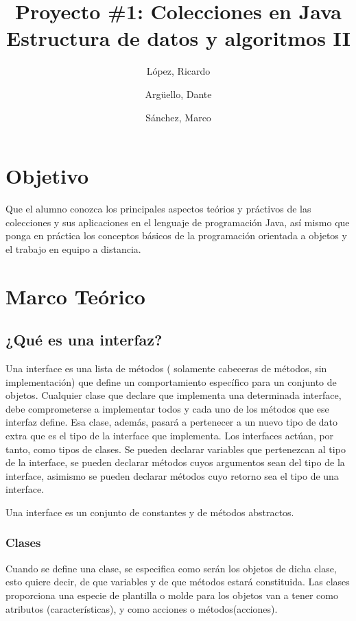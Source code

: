 \documentclass[11pt]{article}
\title{Proyecto \#1: Colecciones en Java\\
Estructura de datos y algoritmos II}
\author{López, Ricardo
\and Argüello, Dante
\and Sánchez, Marco}
\begin{document}
\maketitle{}

\section{Objetivo}
\par

Que el alumno conozca los principales aspectos teórios y práctivos de
las colecciones y sus aplicaciones en el lenguaje de programación Java,
así mismo que ponga en práctica los conceptos básicos de la programación
orientada a objetos y el trabajo en equipo a distancia.

\section{Marco Teórico}
\subsection{¿Qué es una interfaz?}

\par
Una interface es una lista de métodos ( solamente cabeceras de 
métodos, sin implementación) que define un comportamiento específico 
para un conjunto de objetos. Cualquier clase que declare que 
implementa una determinada interface, debe comprometerse a 
implementar todos y cada uno de los métodos que ese interfaz define. 
Esa clase, además, pasará a pertenecer a un nuevo tipo de dato extra 
que es el tipo de la interface que implementa. Los interfaces actúan, 
por tanto, como tipos de clases. Se pueden declarar variables que 
pertenezcan al tipo de la interface, se pueden declarar métodos cuyos 
argumentos sean del tipo de la interface, asimismo se pueden declarar 
métodos cuyo retorno sea el tipo de una interface.

\par
Una interface es un conjunto de constantes y de métodos abstractos.

\subsubsection{Clases}

\par
Cuando se define una clase, se especifica como serán los objetos de 
dicha clase, esto quiere decir, de que variables y de que métodos 
estará constituida. Las clases proporciona una especie de plantilla o 
molde para los objetos van a tener como atributos (características), 
y como acciones o métodos(acciones).
\end{document}
